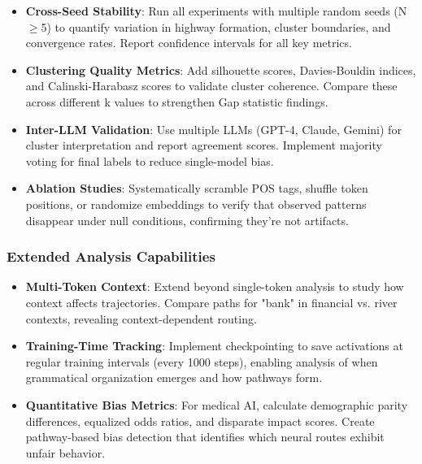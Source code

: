 \begin{itemize}
    \item \textbf{Cross-Seed Stability}: Run all experiments with multiple random seeds (N$\geq$5) to quantify variation in highway formation, cluster boundaries, and convergence rates. Report confidence intervals for all key metrics.
    
    \item \textbf{Clustering Quality Metrics}: Add silhouette scores, Davies-Bouldin indices, and Calinski-Harabasz scores to validate cluster coherence. Compare these across different k values to strengthen Gap statistic findings.
    
    \item \textbf{Inter-LLM Validation}: Use multiple LLMs (GPT-4, Claude, Gemini) for cluster interpretation and report agreement scores. Implement majority voting for final labels to reduce single-model bias.
    
    \item \textbf{Ablation Studies}: Systematically scramble POS tags, shuffle token positions, or randomize embeddings to verify that observed patterns disappear under null conditions, confirming they're not artifacts.
\end{itemize}

\subsubsection{Extended Analysis Capabilities}

\begin{itemize}
    \item \textbf{Multi-Token Context}: Extend beyond single-token analysis to study how context affects trajectories. Compare paths for "bank" in financial vs. river contexts, revealing context-dependent routing.
    
    \item \textbf{Training-Time Tracking}: Implement checkpointing to save activations at regular training intervals (every 1000 steps), enabling analysis of when grammatical organization emerges and how pathways form.
    
    \item \textbf{Quantitative Bias Metrics}: For medical AI, calculate demographic parity differences, equalized odds ratios, and disparate impact scores. Create pathway-based bias detection that identifies which neural routes exhibit unfair behavior.
\end{itemize}

